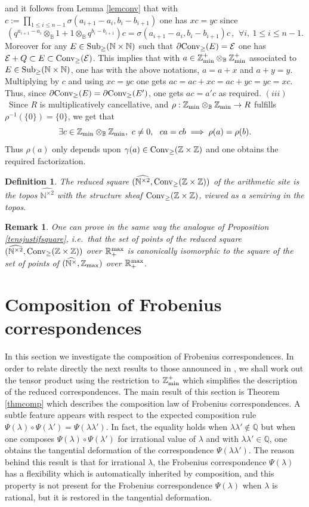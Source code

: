 \documentclass[noams,lp]{compositio}
\newtheorem{defn}[thm]{Definition} %
\newtheorem{rem}[thm]{Remark}
\def\B{{\mathbb B}}
\def\N{{\mathbb N}}
\def\Q{{\mathbb Q}}
\def\R{{\mathbb R}}
\def\Z{{\mathbb Z}}
\def\cE{{\mathcal E}}
\def\qqq{\,,\,~\forall}
\def\sub{{\rm Sub}_\geq}
\def\conv{{\rm Conv}_\geq}
\newcommand{\ie}{{\it i.e.\/}\ }
\def\zmin{\Z_{\rm min}}
\def\zminp{\Z_{\rm min}^+}
\def\zmax{{\Z_{\rm max}}}
\def\rmax{\R_+^{\rm max}}
\def\arith{{(\wnt,\bar \N)}}
\def\wnt{{\widehat{\N^{\times}}}}
\def\nbo{{\zmin\otimes_\B \zmin}}
\def\nboplus{{\zmin^+\otimes_\B \zmin^+}}
\def\arith{{(\wnt,\zmax)}}
\def\wntb{{\widehat{\N^{\times 2}}}}
\def\arithc{{(\wntb,\conv(\Z\times \Z))}}
\begin{document}
and it follows from Lemma \ref{lemconv} that with $c:=\prod_{1\leq i\leq n-1} \sigma(a_{i+1}-a_i,b_i-b_{i+1})$ one has $xc=yc$ since 
$$
\left(q^{a_{i+1}-a_i}\otimes_\B 1+ 1 \otimes_\B q^{b_i-b_{i+1}}\right)c=\sigma(a_{i+1}-a_i,b_i-b_{i+1})c \qqq i, \ 1\leq i\leq n-1.
$$
Moreover for any $E\in \sub(\N\times \N)$ such that $\partial \conv(E)=\cE$ one has $\cE+Q\subset E\subset \conv(\cE)$. This implies that with $a\in \nboplus$ associated to $E\in \sub(\N\times \N)$, one has with the above notations, $a=a+x$ and $a+y=y$. Multiplying by $c$ and using $xc=yc$ one gets $ac=ac+xc=ac+yc=yc=xc$. Thus, since $\partial \conv(E)=\partial \conv(E')$, one gets $ac=a'c$ as required.\newline
$(iii)$~Since $R$ is multiplicatively cancellative, and   $\rho:\nbo\to R$ fulfills $\rho^{-1}(\{0\})=\{0\}$, we get that 
$$
 \exists c\in \nbo, \  c\neq 0, \  \  ca=cb \implies \rho(a)=\rho(b).
$$
Thus $\rho(a)$ only depends upon $\gamma(a)\in \conv(\Z\times \Z)$  and one obtains the required factorization. \endproof

\begin{defn}\label{site3} The {\em reduced square} $\arithc$ of the arithmetic site  is the topos $\wntb$ with the  {\em structure sheaf} $\conv(\Z\times \Z)$, viewed as a semiring in the topos.
\end{defn}

\begin{rem}\label{casereduced}{\rm One can prove in the same way  the analogue of Proposition  \ref{tensjustifsquare}, \ie that the set of points of the reduced square $\arithc$ over $\rmax$ is canonically isomorphic to the square of the set of points of $\arith$ over $\rmax$.
}\end{rem}


\section{Composition of  Frobenius correspondences}\label{sectcomp}

In this section we investigate the composition of  Frobenius correspondences. In order to relate directly the next results to those  announced in \cite{CCas}, we shall work out the tensor product using the restriction to $\zminp$ which simplifies the description of the reduced correspondences. The main result of this section is Theorem \ref{thmcomp} which describes the composition law of Frobenius correspondences. A subtle feature appears with respect to the expected composition rule $\Psi(\lambda)\circ \Psi(\lambda')=\Psi(\lambda\lambda')$. In fact, the equality holds when  $\lambda\lambda'\notin \Q$ but when one composes $\Psi(\lambda)\circ \Psi(\lambda')$  for irrational value of $\lambda$ and with $\lambda\lambda'\in \Q$, one obtains the tangential deformation of the correspondence $\Psi(\lambda\lambda')$. The reason behind this result is that for irrational $\lambda$, the Frobenius correspondence $\Psi(\lambda)$ has a flexibility which is automatically inherited by composition, and this property is not present for the Frobenius correspondence $\Psi(\lambda)$ when $\lambda$ is rational, but it is restored in the tangential deformation.
\end{document}
